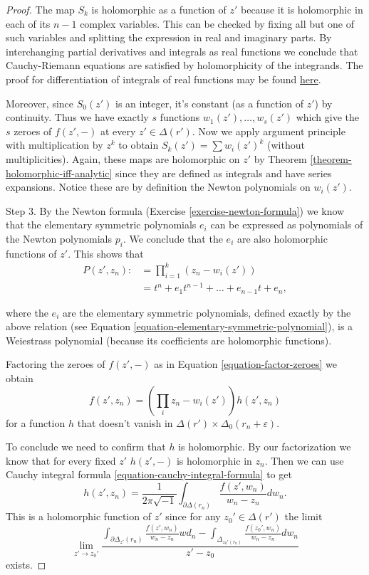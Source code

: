 \begin{proof}
The map $S_k$ is holomorphic as a function of $z'$ because
it is holomorphic in each of its $n-1$ complex variables.
This can be checked by fixing all but one of such variables
and splitting the expression in real and imaginary parts.
By interchanging partial derivatives and integrals as real functions
we conclude that Cauchy-Riemann equations are satisfied
by holomorphicity of the integrands.
The proof for differentiation of integrals of real functions may be found
\href{https://en.wikipedia.org/wiki/Leibniz_integral_rule#Proof_of_basic_form}
{here}.

Moreover, since
$S_0(z')$ is an integer,
it's constant (as a function of $z'$) by continuity.
Thus we have exactly $s$ functions
$w_1(z'),\ldots,w_s(z')$ which give the $s$ zeroes of $f(z',-)$
at every $z' \in \Delta(r')$. 
Now we apply argument principle with multiplication by
$z^k$ to obtain $S_k(z')=\sum w_i(z')^k$ (without multiplicities).
Again, these maps are holomorphic on $z'$ by Theorem
\ref{theorem-holomorphic-iff-analytic} since they are defined as integrals
and have series expansions. 
Notice these are by definition the Newton
polynomials on $w_i(z')$.

\medskip\noindent
Step 3. 
By the Newton formula (Exercise \ref{exercise-newton-formula})
we know that the elementary symmetric polynomials $e_i$ can be expressed 
as polynomials of the Newton polynomials $p_i$.
We conclude that the $e_i$ are also holomorphic functions of $z'$. 
This shows that
\begin{align*}
P(z',z_n):&=\prod_{i=1}^k(z_n-w_i(z'))\\
&=t^n+e_1t^{n-1}+\ldots+e_{n-1}t+e_n,
\end{align*}

\noindent
where the $e_i$ are the elementary symmetric polynomials,
defined exactly by the above relation (see 
Equation \ref{equation-elementary-symmetric-polynomial}),
is a Weiestrass polynomial 
(because its coefficients are holomorphic functions).

Factoring the zeroes of $f(z',-)$ as in
Equation \ref{equation-factor-zeroes}
we obtain
$$
f(z',z_n)=\left(\prod_{i}z_n-w_i(z')\right)h(z',z_n)
$$
for a function $h$ that doesn't vanish in 
$\Delta(r')\times \Delta_0(r_n+\varepsilon)$.

To conclude we need to confirm that $h$ is holomorphic.
By our factorization we know that for every fixed $z'$ 
$h(z',-)$ is holomorphic in $z_n$.
Then we can use Cauchy integral formula \ref{equation-cauchy-integral-formula}
to get
$$
h(z',z_n)=\frac{1}{2\pi\sqrt{-1}}
\int_{\partial\Delta(r_n)}\frac{f(z',w_n)}{w_n-z_n}dw_n.
$$
This is a holomorphic function of $z'$ since
for any $z_0' \in \Delta(r')$ the limit
$$
\lim_{z'\to z_0'}
\frac{
\int_{\partial\Delta_{z'}(r_n)}
\frac{f(z',w_n)}{w_n-z_n}wd_n
-
\int_{\Delta_{z_0'(r_n)}}
\frac{f(z_0',w_n)}{w_n-z_n}dw_n}
{z'-z_0}
$$
exists.


\end{proof}

